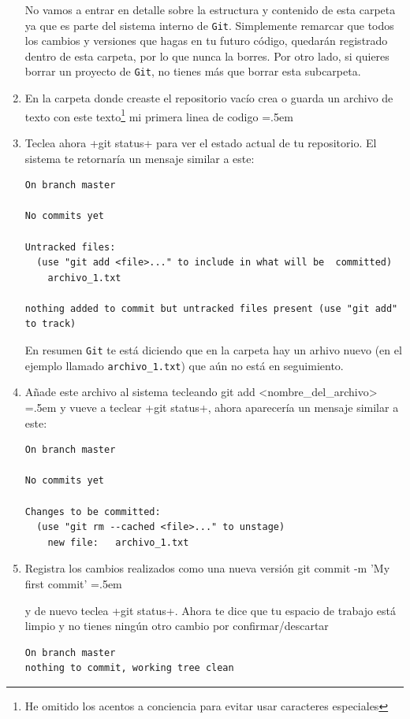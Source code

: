\documentclass[a5paper,10pt]{article}
\newenvironment{cverbatim}
 {\SaveVerbatim{cverb}}
 {\endSaveVerbatim
  \flushleft\fboxrule=0pt\fboxsep=.5em
  \colorbox{bg}{\BUseVerbatim{cverb}}%
  \endflushleft
}
\begin{document}
\begin{enumerate}
      No vamos a entrar en detalle sobre la estructura y contenido de esta carpeta ya que es parte del sistema interno de \verb+Git+. Simplemente remarcar que todos los cambios y versiones que hagas en tu futuro código, quedarán registrado dentro de esta carpeta, por lo que nunca la borres. Por otro lado, si quieres borrar un proyecto de \verb+Git+, no tienes más que borrar esta subcarpeta.
    
    \item En la carpeta donde creaste el repositorio vacío crea o guarda un archivo de texto con este texto\footnote{He omitido los acentos a conciencia para evitar usar caracteres especiales}
    \begin{cverbatim}
mi primera linea de codigo
    \end{cverbatim}
    
    \item Teclea ahora \cverb+git status+ para ver el estado actual de tu repositorio. El sistema te retornaría un mensaje similar a este:
    
    \begin{lstlisting}[style=custom]
On branch master

No commits yet

Untracked files:
  (use "git add <file>..." to include in what will be  committed)
	archivo_1.txt

nothing added to commit but untracked files present (use "git add" to track)
    \end{lstlisting}
    En resumen \verb+Git+ te está diciendo que en la carpeta hay un arhivo nuevo (en el ejemplo llamado \verb+archivo_1.txt+) que aún no está en seguimiento.

    \item Añade este archivo al sistema tecleando
    \begin{cverbatim}
git add <nombre_del_archivo>
    \end{cverbatim}
    y vueve a teclear \cverb+git status+, ahora aparecería un mensaje similar a este:
    
    \begin{lstlisting}[style=custom]
On branch master

No commits yet

Changes to be committed:
  (use "git rm --cached <file>..." to unstage)
	new file:   archivo_1.txt
    \end{lstlisting}

    \item Registra los cambios realizados como una nueva versión
    \begin{cverbatim}
git commit -m 'My first commit'
    \end{cverbatim}
    
    y de nuevo teclea \cverb+git status+. Ahora te dice que tu espacio de trabajo está limpio y no tienes ningún otro cambio por confirmar/descartar

    \begin{lstlisting}[style=custom]
On branch master
nothing to commit, working tree clean
    \end{lstlisting}
    
    \end{enumerate}
    
\end{document}
